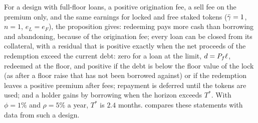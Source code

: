 For a design with full-floor loans, a positive origination fee, a sell fee on the premium only, and the same earnings for locked and free staked tokens ($\bar\gamma=1$, $n=1$, $e_L=e_F$), the proposition gives: redeeming pays more cash than borrowing and abandoning, because of the origination fee; every loan can be closed from its collateral, with a residual that is positive exactly when the net proceeds of the redemption exceed the current debt: zero for a loan at the limit, $d=P_f\ell$, redeemed at the floor, and positive if the debt is below the floor value of the lock (as after a floor raise that has not been borrowed against) or if the redemption leaves a positive premium after fees; repayment is deferred until the tokens are used; and a holder gains by borrowing when the horizon exceeds $T^\ast$. With $\phi=1\%$ and $\rho=5\%$ a year, $T^\ast$ is $2.4$ months.  compares these statements with data from such a design.
